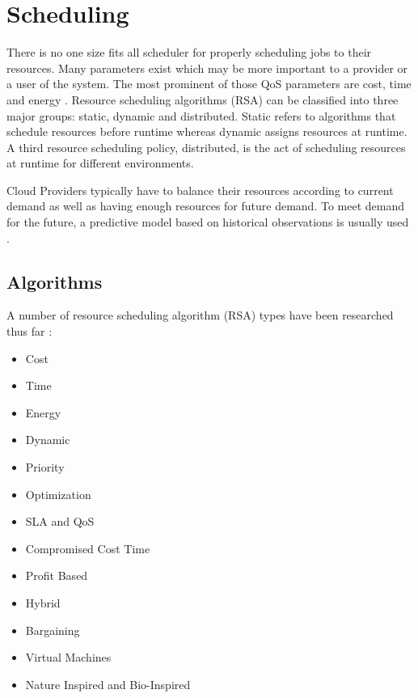 \documentclass[12pt]{article}
\begin{document}


\cite{liu2015survey,kazim2015survey,kalpana2015brief}



\section{Scheduling} \label{sec:scheduling}

There is no one size fits all scheduler for properly scheduling jobs to their resources. Many parameters exist which may be more important to a provider or a user of the system. The most prominent of those QoS parameters are cost, time and energy \cite{Singh2016}. Resource scheduling algorithms (RSA) can be classified into three major groups: static, dynamic and distributed. Static refers to algorithms that schedule resources before runtime whereas dynamic assigns resources at runtime. A third resource scheduling policy, distributed, is the act of scheduling resources at runtime for different environments.


Cloud Providers typically have to balance their resources according to current demand as well as having enough resources for future demand. To meet demand for the future, a predictive model based on historical observations is usually used \cite{Jennings2015}.

\subsection{Algorithms} \label{sub:schedalgorithms}

A number of resource scheduling algorithm (RSA) types have been researched thus far \cite{Singh2016}:
\begin{itemize}
    \item Cost
    \item Time
    \item Energy
    \item Dynamic
    \item Priority
    \item Optimization
    \item SLA and QoS
    \item Compromised Cost Time
    \item Profit Based
    \item Hybrid
    \item Bargaining
    \item Virtual Machines
    \item Nature Inspired and Bio-Inspired
\end{itemize}
\end{document}
